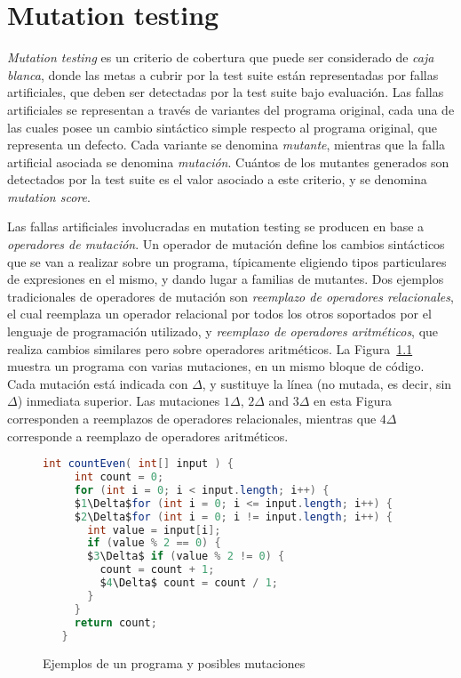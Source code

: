\chapter[Mutation]{Mutation testing}
\label{cap:preliminares.mutation}

\emph{Mutation testing} es un criterio de cobertura que puede ser considerado de \emph{caja blanca}, donde las metas a cubrir por la test suite est\'an representadas por fallas artificiales, que deben ser detectadas por la test suite bajo evaluaci\'on. Las fallas artificiales se representan a trav\'es de variantes del programa original, cada una de las cuales posee un cambio sint\'actico simple respecto al programa original, que representa un defecto. Cada variante se denomina \emph{mutante}, mientras que la falla artificial asociada se denomina \emph{mutaci\'on}. Cu\'antos de los mutantes generados son detectados por la test suite es el valor asociado a este criterio, y se denomina \emph{mutation score}.

Las fallas artificiales involucradas en mutation testing se producen en base a \emph{operadores de mutaci\'on}. Un operador de mutaci\'on define los cambios sint\'acticos que se van a realizar sobre un programa, t\'ipicamente eligiendo tipos particulares de expresiones en el mismo, y dando lugar a familias de mutantes. Dos ejemplos tradicionales de operadores de mutaci\'on son \emph{reemplazo de operadores relacionales}, el cual reemplaza un operador relacional por todos los otros soportados por el lenguaje de programaci\'on utilizado, y \emph{reemplazo de operadores aritm\'eticos}, que realiza cambios similares pero sobre operadores aritm\'eticos. La Figura~\ref{figures.examples.mutations} muestra un programa con varias mutaciones, en un mismo bloque de c\'odigo. Cada mutaci\'on est\'a indicada con $\Delta$, y sustituye la l\'inea (no mutada, es decir, sin $\Delta$) inmediata superior. Las mutaciones $1\Delta$, $2\Delta$ and $3\Delta$ en esta Figura corresponden a reemplazos de operadores relacionales, mientras que $4\Delta$ corresponde a reemplazo de operadores aritm\'eticos.

\begin{figure}[t]
	\begin{lstlisting}[frame=tlrb, mathescape=true,language=Java,basicstyle={},xleftmargin=.011\textwidth,xrightmargin=.011\textwidth]
   int countEven( int[] input ) {
     int count = 0;
     for (int i = 0; i < input.length; i++) {
     $1\Delta$for (int i = 0; i <= input.length; i++) {
     $2\Delta$for (int i = 0; i != input.length; i++) {
       int value = input[i];
       if (value % 2 == 0) {
       $3\Delta$ if (value % 2 != 0) {
         count = count + 1;
         $4\Delta$ count = count / 1;
       }
     }
     return count;
   }
	\end{lstlisting}
	\caption{Ejemplos de un programa y posibles mutaciones}
	\label{figures.examples.mutations}
\end{figure}

